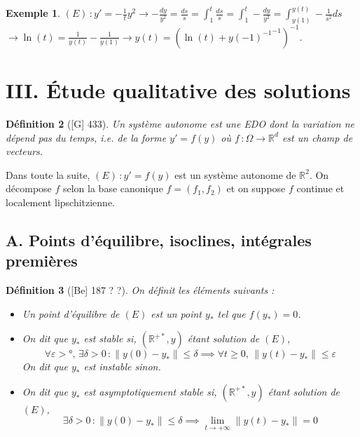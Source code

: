 \documentclass[10pt, a4paper, parskip=full, twoside, twocolumn]{report}
\newtheorem{definition}{Définition}
\newtheorem{example}[definition]{Exemple}
\newcommand{\IR}{\mathbb{R}}
\begin{document}
\begin{example}
	$(E)\,\colon y' = -\frac{1}{t}y^2 \longrightarrow -\frac{dy}{y^2} = \frac{ds}{s} = \int_{1}^{t}\frac{ds}{s} = \int_{1}^{t}-\frac{dy}{y^2} = \int_{y(1)}^{y(t)}-\frac{1}{s^2}ds$
	$\longrightarrow \ln(t) = \frac{1}{y(t)} - \frac{1}{y(1)} \longrightarrow y(t) = \left(\ln(t) + {y(-1)^{-1}}^{-1}\right)^{-1}$.
\end{example}

\section*{III. Étude qualitative des solutions}
\begin{definition}[\textnormal{[G] 433}]
	Un \emph{système autonome} est une EDO dont la variation ne dépend pas du temps, \emph{i.e.} de la forme $y'=f(y)$ où $f\,\colon \Omega\to \IR^d$ est un champ de vecteurs.
\end{definition}

\textcolor{paragraphtext}{Dans toute la suite, $(E)\,\colon y'=f(y)$ est un système autonome de $\IR^2$. On décompose $f$ selon la base canonique $f=(f_1,f_2)$ et on suppose $f$ continue et localement lipschitzienne.}

\subsection*{A. Points d'équilibre, isoclines, intégrales premières}

\begin{definition}[\textnormal{[Be] 187 ? ?}]
	On définit les éléments suivants :
	\begin{itemize}
		\item Un \emph{point d'équilibre de $(E)$} est un point $y_*$ tel que $f(y_*) = 0$.
		\item On dit que $y_*$ est \emph{stable} si, $(\IR^{+*}, y)$ étant solution de $(E)$, $$\forall \varepsilon > °,\, \exists \delta > 0\,\colon \|y(0)-y_*\|\leq \delta \implies \forall t\geq 0,\, \|y(t) - y_*\|\leq \varepsilon$$ On dit que $y_*$ est \emph{instable} sinon.
		\item On dit que $y_*$ est \emph{asymptotiquement stable} si, $(\IR^{+*}, y)$ étant solution de $(E)$, $$\exists \delta > 0\,\colon \|y(0) - y_*\|\leq \delta\implies \lim_{t\to +\infty} \|y(t)-y_*\| = 0$$
	\end{itemize}
\end{definition}
\end{document}
